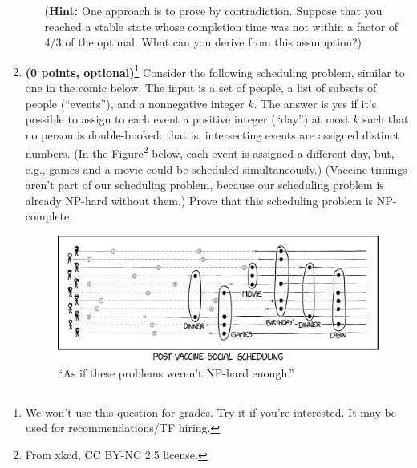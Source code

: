 \documentclass[11pt]{article}
\begin{document}
\begin{enumerate}
\begin{enumerate}
({\bf Hint:} One approach is to prove by contradiction.  Suppose that 
you reached a stable state whose completion time was not within a factor
of 4/3 of the optimal.  What can you derive from this assumption?)  
\end{enumerate}

\item
{\bf (0 points, optional)}\footnote{We won't use this question for grades. Try it if you're interested. 
It may be used for recommendations/TF hiring.}
Consider the following scheduling problem, similar to one in the comic below. The input is a set of people, a list of subsets of people (``events''), and a nonnegative integer $k$. 
The answer is yes if it's possible to assign to each event a positive integer (``day'') at most $k$ such that no person is double-booked: that is,
intersecting events are assigned distinct numbers. (In the Figure\footnote{From xkcd, CC BY-NC 2.5 license.} below, each event is assigned a different day,
but, e.g., games and a movie could be scheduled simultaneously.)
(Vaccine timings aren't part of our scheduling problem, because our scheduling problem is already NP-hard without them.)
Prove that this scheduling problem is NP-complete.

\begin{figure}[h]
\begin{centering}
\includegraphics[width=5in]{post_vaccine_social_scheduling_2x.png}
\caption{``As if these problems weren't NP-hard enough.''}
\end{centering}
\end{figure}


\end{enumerate}
\end{document}

